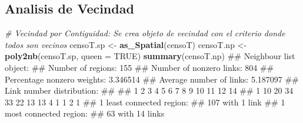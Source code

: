 \documentclass[11pt,]{article}
\newenvironment{Shaded}{\begin{snugshade}}{\end{snugshade}}
\newcommand{\KeywordTok}[1]{\textcolor[rgb]{0.13,0.29,0.53}{\textbf{#1}}}
\newcommand{\DataTypeTok}[1]{\textcolor[rgb]{0.13,0.29,0.53}{#1}}
\newcommand{\StringTok}[1]{\textcolor[rgb]{0.31,0.60,0.02}{#1}}
\newcommand{\CommentTok}[1]{\textcolor[rgb]{0.56,0.35,0.01}{\textit{#1}}}
\newcommand{\OtherTok}[1]{\textcolor[rgb]{0.56,0.35,0.01}{#1}}
\newcommand{\NormalTok}[1]{#1}
\begin{document}
\subsection{Analisis de Vecindad}\label{analisis-de-vecindad}

\begin{Shaded}
\begin{Highlighting}[]
\CommentTok{# Vecindad por Contiguidad: Se crea objeto de vecindad con el criterio donde todos son vecinos}
\NormalTok{censoT.sp <-}\StringTok{ }\KeywordTok{as_Spatial}\NormalTok{(censoT)}
\NormalTok{censoT.np <-}\StringTok{ }\KeywordTok{poly2nb}\NormalTok{(censoT.sp, }\DataTypeTok{queen =} \OtherTok{TRUE}\NormalTok{) }
\KeywordTok{summary}\NormalTok{(censoT.np)}
\NormalTok{## Neighbour list object:}
\NormalTok{## Number of regions: 155 }
\NormalTok{## Number of nonzero links: 804 }
\NormalTok{## Percentage nonzero weights: 3.346514 }
\NormalTok{## Average number of links: 5.187097 }
\NormalTok{## Link number distribution:}
\NormalTok{## }
\NormalTok{##  1  2  3  4  5  6  7  8  9 10 11 12 14 }
\NormalTok{##  1 10 20 34 33 22 13 13  4  1  1  2  1 }
\NormalTok{## 1 least connected region:}
\NormalTok{## 107 with 1 link}
\NormalTok{## 1 most connected region:}
\NormalTok{## 63 with 14 links}


\end{Highlighting}
\end{Shaded}
\end{document}
